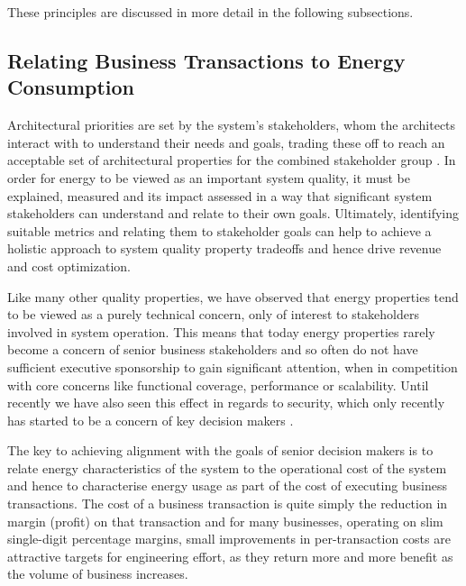 These principles are discussed in more detail in the following subsections. 

\subsection{Relating Business Transactions to Energy Consumption}

Architectural priorities are set by the system's stakeholders, whom the architects interact with to understand their needs and goals, trading these off to reach an acceptable set of architectural properties for the combined stakeholder group \cite{rozanski2011-ssa2e}.  In order for energy to be viewed as an important system quality, it must be explained, measured and its impact assessed in a way that significant system stakeholders can understand and relate to their own goals.  Ultimately, identifying suitable metrics and relating them to stakeholder goals can help to achieve a holistic approach to system quality property tradeoffs and hence drive revenue and cost optimization.

Like many other quality properties, we have observed that energy properties tend to be viewed as a purely technical concern, only of interest to stakeholders involved in system operation.  This means that today energy properties rarely become a concern of senior business stakeholders and so often do not have sufficient executive sponsorship to gain significant attention, when in competition with core concerns like functional coverage, performance or scalability.  Until recently we have also seen this effect in regards to security, which only recently has started to be a concern of key decision makers \cite{cisco2016-uksecprioritisation}.

The key to achieving alignment with the goals of senior decision makers is to relate energy characteristics of the system to the operational cost of the system and hence to characterise energy usage as part of the cost of executing business transactions.  The cost of a business transaction is quite simply the reduction in margin (profit) on that transaction and for many businesses, operating on slim single-digit percentage margins, small improvements in per-transaction costs are attractive targets for engineering effort, as they return more and more benefit as the volume of business increases.

